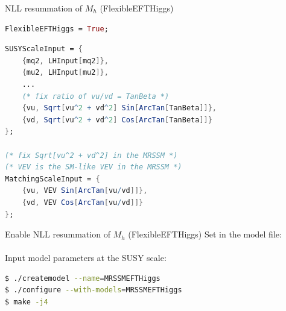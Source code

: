 \documentclass[hyperref={pdfpagelabels=false},ngerman]{beamer}
\newcommand{\SM}{\ensuremath{\text{SM}}}
\newcommand{\MRSSM}{\ensuremath{\text{MRSSM}}}
\begin{document}
\begin{frame}{NLL resummation of $M_h$ (FlexibleEFTHiggs)}
  \begin{center}
  \end{center}
\end{frame}

\begin{lrbox}{\listbox}\begin{lstlisting}[language=Mathematica]
FlexibleEFTHiggs = True;
\end{lstlisting}\end{lrbox} %

\begin{lrbox}{\listboxt}\begin{lstlisting}[language=Mathematica]
SUSYScaleInput = {
    {mq2, LHInput[mq2]},
    {mu2, LHInput[mu2]},
    ...
    (* fix ratio of vu/vd = TanBeta *)
    {vu, Sqrt[vu^2 + vd^2] Sin[ArcTan[TanBeta]]},
    {vd, Sqrt[vu^2 + vd^2] Cos[ArcTan[TanBeta]]}
};

(* fix Sqrt[vu^2 + vd^2] in the MRSSM *)
(* VEV is the SM-like VEV in the MRSSM *)
MatchingScaleInput = {
    {vu, VEV Sin[ArcTan[vu/vd]]},
    {vd, VEV Cos[ArcTan[vu/vd]]}
};
\end{lstlisting}\end{lrbox} %

\begin{frame}{Enable NLL resummation of $M_h$ (FlexibleEFTHiggs)}
  Set in the model file:\\[1em]
  \usebox{\listbox}
  \\[1em]
  Input model parameters at the SUSY scale:
  \\[1.5em]
  \usebox{\listboxt}
\end{frame}

\begin{lrbox}{\listbox}\begin{lstlisting}[language=bash]
$ ./createmodel --name=MRSSMEFTHiggs
$ ./configure --with-models=MRSSMEFTHiggs
$ make -j4
\end{lstlisting}\end{lrbox} %
\end{document}
